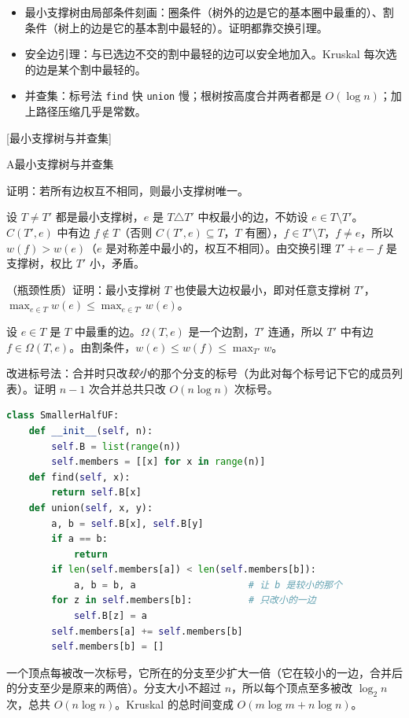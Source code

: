 
\begin{itemize}
\item 最小支撑树由局部条件刻画：圈条件（树外的边是它的基本圈中最重的）、割条件（树上的边是它的基本割中最轻的）。证明都靠交换引理。
\item 安全边引理：与已选边不交的割中最轻的边可以安全地加入。Kruskal 每次选的边是某个割中最轻的。
\item 并查集：标号法 \texttt{find} 快 \texttt{union} 慢；根树按高度合并两者都是 $O(\log n)$；加上路径压缩几乎是常数。
\end{itemize}

[最小支撑树与并查集]


\begin{exercises}{A}{最小支撑树与并查集}
\item\label{ex:mst-kruskal:A1} 证明：若所有边权互不相同，则最小支撑树唯一。
\begin{solution}
设 $T\neq T'$ 都是最小支撑树，$e$ 是 $T\triangle T'$ 中权最小的边，不妨设 $e\in T\setminus T'$。$C(T',e)$ 中有边 $f\notin T$（否则 $C(T',e)\subseteq T$，$T$ 有圈），$f\in T'\setminus T$，$f\neq e$，所以 $w(f)>w(e)$（$e$ 是对称差中最小的，权互不相同）。由交换引理 $T'+e-f$ 是支撑树，权比 $T'$ 小，矛盾。
\end{solution}

\item\label{ex:mst-kruskal:A2} （瓶颈性质）证明：最小支撑树 $T$ 也使最大边权最小，即对任意支撑树 $T'$，$\max_{e\in T}w(e)\leqslant\max_{e\in T'}w(e)$。
\begin{solution}
设 $e\in T$ 是 $T$ 中最重的边。$\Omega(T,e)$ 是一个边割，$T'$ 连通，所以 $T'$ 中有边 $f\in\Omega(T,e)$。由割条件，$w(e)\leqslant w(f)\leqslant\max_{T'}w$。
\end{solution}

\item\label{ex:mst-kruskal:A3} 改进标号法：合并时只改\emph{较小}的那个分支的标号（为此对每个标号记下它的成员列表）。证明 $n-1$ 次合并总共只改 $O(n\log n)$ 次标号。
\begin{solution}
\begin{lstlisting}[language=Python]
class SmallerHalfUF:
    def __init__(self, n):
        self.B = list(range(n))
        self.members = [[x] for x in range(n)]
    def find(self, x):
        return self.B[x]
    def union(self, x, y):
        a, b = self.B[x], self.B[y]
        if a == b:
            return
        if len(self.members[a]) < len(self.members[b]):
            a, b = b, a                    # 让 b 是较小的那个
        for z in self.members[b]:          # 只改小的一边
            self.B[z] = a
        self.members[a] += self.members[b]
        self.members[b] = []
\end{lstlisting}
一个顶点每被改一次标号，它所在的分支至少扩大一倍（它在较小的一边，合并后的分支至少是原来的两倍）。分支大小不超过 $n$，所以每个顶点至多被改 $\log_2n$ 次，总共 $O(n\log n)$。Kruskal 的总时间变成 $O(m\log m+n\log n)$。
\end{solution}


\end{exercises}
